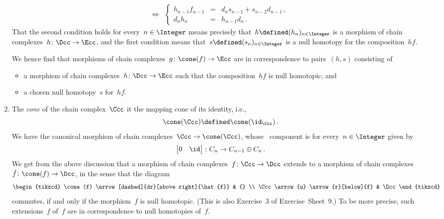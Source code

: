 \begin{remark*}
\begin{enumerate}
\begin{align*}
        \iff&{}   \left\{
                    \begin{array}{rcl}
                      h_{n-1} f_{n-1} &=& d_n s_{n-1} + s_{n-2} d_{n-1} \,, \\
                      d_n h_n     &=& h_{n-1} d_n \,.
                    \end{array}
                  \right.
      \end{align*}
      That the second condition holds for every~$n \in \Integer$ means precisely that~$h \defined (h_n)_{n \in \Integer}$ is a morphism of chain complexes~$h \colon \Dcc \to \Ecc$, and the first condition means that~$s \defined (s_n)_{n \in \Integer}$ is a null homotopy for the composition~$h f$.
      
      We hence find that morphisms of chain complexes~$g \colon \cone(f) \to \Ecc$ are in {\onetoone} correspondence to pairs~$(h,s)$ consisting of
      \begin{itemize}
        \item
          a morphism of chain complexes~$h \colon \Dcc \to \Ecc$ such that the composition~$hf$ is null homotopic, and
        \item
          a chosen null homotopy~$s$ for~$hf$.
      \end{itemize}
    \item
      The \emph{cone} of the chain complex~$\Ccc$ it the mapping cone of its identity, i.e.,
      \[
                  \cone(\Ccc)
        \defined  \cone(\id_{\Ccc}) \,.
      \]
      We have the canonical morphism of chain complexes~$\Ccc \to \cone(\Ccc)$, whose~ component is for every~$n \in \Integer$ given by
      \[
        \begin{bmatrix}
            0
          & \id
        \end{bmatrix}
        \colon
        C_n
        \to
        C_{n-1} \oplus C_n \,.
      \]
      We get from the above discussion that a morphism of chain complexes~$f \colon \Ccc \to \Dcc$ extends to a morphism of chain complexes~$\hat{f} \colon \cone(f) \to \Dcc$, in the sense that the diagram
      \[
        \begin{tikzcd}
            \cone(f)
            \arrow[dashed]{dr}[above right]{\hat{f}}
          & {}
          \\
            \Ccc
            \arrow{u}
            \arrow{r}[below]{f}
          & \Dcc
        \end{tikzcd}
      \]
      commutes, if and only if the morphism~$f$ is null homotopic.
      (This is also Exercise~3 of Exercise~Sheet~9.)
      To be more precise, such extensions~$\hat{f}$ of~$f$ are in {\onetoone} correspondence to null homotopies of~$f$.
  \end{enumerate}
\end{remark*}










